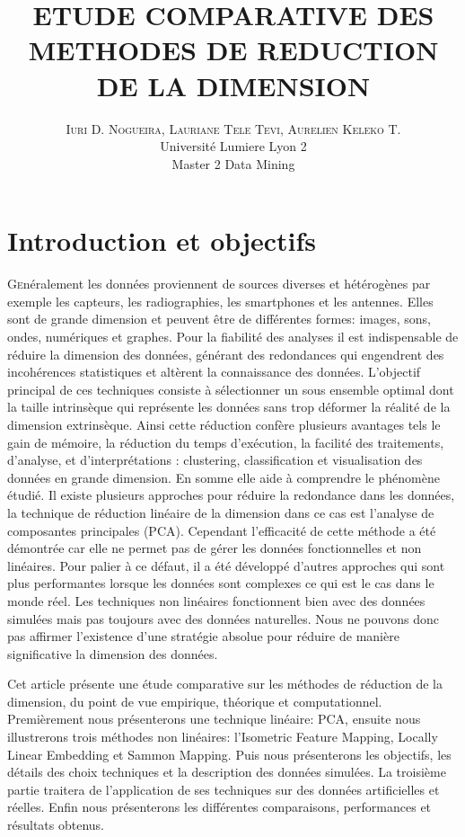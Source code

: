 \documentclass[twoside,twocolumn]{article}
\title{ETUDE COMPARATIVE DES METHODES DE REDUCTION
DE LA DIMENSION 
} %
\author{%
\textsc{Iuri D. Nogueira, Lauriane Tele Tevi, Aurelien Keleko T.} \\[1ex] %
\normalsize Université Lumiere Lyon 2 \\ %
\normalsize Master 2 Data Mining  
}
\begin{document}
\maketitle


\section{Introduction et objectifs}

\lettrine[nindent=0em,lines=2]{G} 
enéralement les données proviennent de sources diverses et hétérogènes par exemple les capteurs, les radiographies, les smartphones et les antennes. Elles sont de grande dimension et peuvent être de différentes formes: images, sons, ondes, numériques et graphes.
Pour la fiabilité des analyses il est indispensable de réduire la dimension des données, générant des redondances qui engendrent des incohérences statistiques et altèrent la connaissance des données.  
L’objectif principal de ces techniques consiste à sélectionner un sous ensemble optimal dont la taille intrinsèque qui représente les données sans trop déformer la réalité de la dimension extrinsèque. Ainsi cette réduction confère plusieurs avantages tels le gain de mémoire, la réduction du temps d’exécution, la facilité des traitements, d'analyse, et d'interprétations : clustering, classification et visualisation des données en grande dimension. En somme elle aide à comprendre le phénomène étudié.
Il existe plusieurs approches pour réduire la redondance dans les données, la technique de réduction linéaire de la dimension dans ce cas est l’analyse de composantes principales (PCA). Cependant l’efficacité de cette méthode a été démontrée car elle ne permet pas de gérer les données fonctionnelles et non linéaires. Pour palier à ce défaut, il a été développé d’autres approches qui sont plus performantes lorsque les données sont complexes ce qui est le cas dans le monde réel. Les techniques non linéaires fonctionnent bien avec des données simulées mais pas toujours avec des données naturelles. Nous ne pouvons donc pas affirmer l’existence d’une stratégie absolue pour réduire de manière significative la dimension des données.

Cet article présente une étude comparative sur les méthodes de réduction de la dimension, du point de vue empirique, théorique et computationnel. Premièrement nous présenterons une technique linéaire: PCA, ensuite nous illustrerons trois méthodes non linéaires: l’Isometric Feature Mapping, Locally Linear Embedding et Sammon Mapping. Puis nous présenterons les objectifs, les détails des choix techniques et la description des données simulées. La troisième partie traitera de l’application de ses techniques sur des données artificielles et réelles. Enfin nous présenterons les différentes comparaisons, performances et résultats obtenus.
\end{document}

